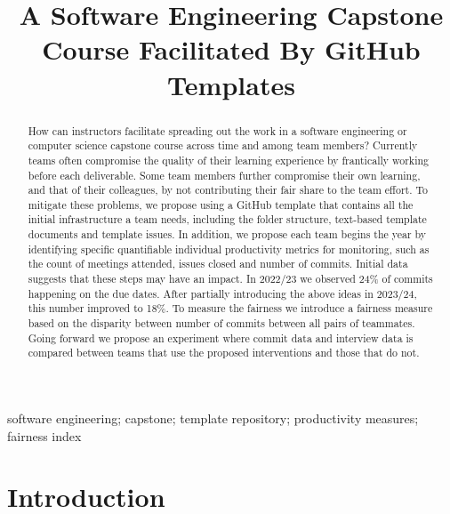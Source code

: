 \documentclass[10pt, conference]{IEEEtran}
\begin{document}
\title{A Software Engineering Capstone Course Facilitated By GitHub Templates}


\author{
}

\maketitle
  
\begin{abstract}

How can instructors facilitate spreading out the work in a software engineering
or computer science capstone course across time and among team members?
Currently teams often compromise the quality of their learning experience by
frantically working before each deliverable.  Some team members further
compromise their own learning, and that of their colleagues, by not contributing
their fair share to the team effort. To mitigate these problems, we propose
using a GitHub template that contains all the initial infrastructure a team
needs, including the folder structure, text-based template documents and
template issues. In addition, we propose each team begins the year by
identifying specific quantifiable individual productivity metrics for
monitoring, such as the count of meetings attended, issues closed and number of
commits.  Initial data suggests that these steps may have an impact.  In 2022/23
we observed 24\% of commits happening on the due dates.  After partially
introducing the above ideas in 2023/24, this number improved to 18\%.  To
measure the fairness we introduce a fairness measure based on the disparity
between number of commits between all pairs of teammates.  Going forward we
propose an experiment where commit data and interview data is compared between
teams that use the proposed interventions and those that do not.

\end{abstract}

\begin{IEEEkeywords}
software engineering; capstone; template repository; productivity measures;
fairness index
\end{IEEEkeywords}

\section{Introduction} \label{SecIntro}
\end{document}
